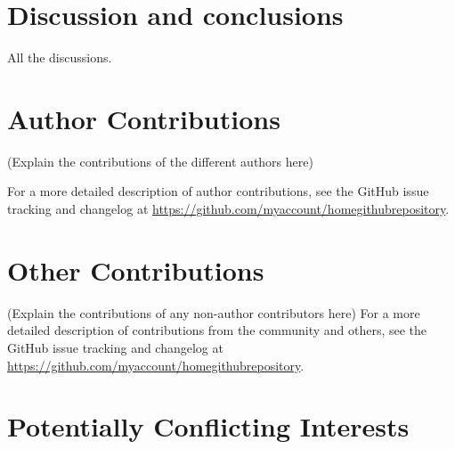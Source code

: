 \documentclass[9pt,comparison]{livecoms}
\newcommand{\githubrepository}{\url{https://github.com/myaccount/homegithubrepository}}  %
\begin{document}
\section{Discussion and conclusions}

All the discussions. 



\section{Author Contributions}
%

(Explain the contributions of the different authors here)

For a more detailed description of author contributions,
see the GitHub issue tracking and changelog at \githubrepository.

\section{Other Contributions}
%

(Explain the contributions of any non-author contributors here)
For a more detailed description of contributions from the community and others, see the GitHub issue tracking and changelog at \githubrepository.

\section{Potentially Conflicting Interests}
\end{document}
